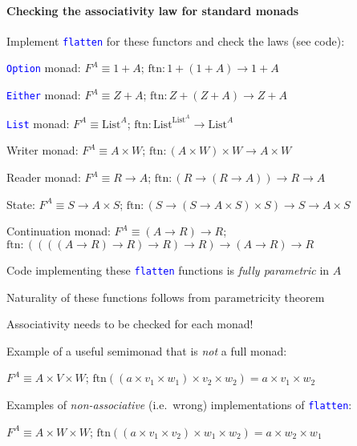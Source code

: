 \paragraph{Checking the associativity law for standard monads}

Implement \texttt{\textcolor{blue}{\footnotesize{}flatten}} for these
functors and check the laws (see code):

\texttt{\textcolor{blue}{\footnotesize{}Option}} monad: $F^{A}\equiv1+A$;
$\text{ftn}:1+\left(1+A\right)\rightarrow1+A$

\texttt{\textcolor{blue}{\footnotesize{}Either}} monad: $F^{A}\equiv Z+A$;
$\text{ftn}:Z+\left(Z+A\right)\rightarrow Z+A$

\texttt{\textcolor{blue}{\footnotesize{}List}} monad: $F^{A}\equiv\text{List}^{A}$;
$\text{ftn}:\text{List}^{\text{List}^{A}}\rightarrow\text{List}^{A}$

Writer monad: $F^{A}\equiv A\times W$; $\text{ftn}:\left(A\times W\right)\times W\rightarrow A\times W$

Reader monad: $F^{A}\equiv R\rightarrow A$; $\text{ftn}:\left(R\rightarrow\left(R\rightarrow A\right)\right)\rightarrow R\rightarrow A$

State: $F^{A}\equiv S\rightarrow A\times S$; $\text{ftn}:\left(S\rightarrow\left(S\rightarrow A\times S\right)\times S\right)\rightarrow S\rightarrow A\times S$

Continuation monad: $F^{A}\equiv\left(A\rightarrow R\right)\rightarrow R$;
$\text{ftn}:\left(\left(\left(\left(A\rightarrow R\right)\rightarrow R\right)\rightarrow R\right)\rightarrow R\right)\rightarrow\left(A\rightarrow R\right)\rightarrow R$

Code implementing these \texttt{\textcolor{blue}{\footnotesize{}flatten}}
functions is \emph{fully parametric} in $A$

Naturality of these functions follows from parametricity theorem

Associativity needs to be checked for each monad!

Example of a useful semimonad that is \emph{not} a full monad:

$F^{A}\equiv A\times V\times W$; $\text{ftn}\left(\left(a\times v_{1}\times w_{1}\right)\times v_{2}\times w_{2}\right)=a\times v_{1}\times w_{2}$

Examples of \emph{non-associative} (i.e.\ wrong) implementations
of \texttt{\textcolor{blue}{\footnotesize{}flatten}}:

$F^{A}\equiv A\times W\times W$; $\text{ftn}\left(\left(a\times v_{1}\times v_{2}\right)\times w_{1}\times w_{2}\right)=a\times w_{2}\times w_{1}$

